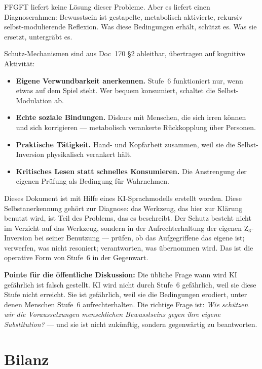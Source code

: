 FFGFT liefert keine Lösung dieser Probleme. Aber es liefert einen Diagnoserahmen: Bewusstsein ist gestapelte, metabolisch aktivierte, rekursiv selbst-modulierende Reflexion. Was diese Bedingungen erhält, schützt es. Was sie ersetzt, untergräbt es.

Schutz-Mechanismen sind aus Doc~170 \S2 ableitbar, übertragen auf kognitive Aktivität:

\begin{itemize}
\item \textbf{Eigene Verwundbarkeit anerkennen.} Stufe~6 funktioniert nur, wenn etwas auf dem Spiel steht. Wer bequem konsumiert, schaltet die Selbst-Modulation ab.
\item \textbf{Echte soziale Bindungen.} Diskurs mit Menschen, die sich irren können und sich korrigieren --- metabolisch verankerte Rückkopplung über Personen.
\item \textbf{Praktische Tätigkeit.} Hand- und Kopfarbeit zusammen, weil sie die Selbst-Inversion physikalisch verankert hält.
\item \textbf{Kritisches Lesen statt schnelles Konsumieren.} Die Anstrengung der eigenen Prüfung als Bedingung für Wahrnehmen.
\end{itemize}

\begin{philosophical}[Selbstanerkennung]
Dieses Dokument ist mit Hilfe eines KI-Sprachmodells erstellt worden. Diese Selbstanerkennung gehört zur Diagnose: das Werkzeug, das hier zur Klärung benutzt wird, ist Teil des Problems, das es beschreibt. Der Schutz besteht nicht im Verzicht auf das Werkzeug, sondern in der Aufrechterhaltung der eigenen Z$_3$-Inversion bei seiner Benutzung --- prüfen, ob das Aufgegriffene das eigene ist; verwerfen, was nicht resoniert; verantworten, was übernommen wird. Das ist die operative Form von Stufe~6 in der Gegenwart.
\end{philosophical}

\textbf{Pointe für die öffentliche Diskussion:} Die übliche Frage \glqq wann wird KI gefährlich\grqq{} ist falsch gestellt. KI wird nicht durch Stufe~6 gefährlich, weil sie diese Stufe nicht erreicht. Sie ist gefährlich, weil sie die Bedingungen erodiert, unter denen Menschen Stufe~6 aufrechterhalten. Die richtige Frage ist: \emph{Wie schützen wir die Voraussetzungen menschlichen Bewusstseins gegen ihre eigene Substitution?} --- und sie ist nicht zukünftig, sondern gegenwärtig zu beantworten.

\section{Bilanz}\label{sec:bilanz}

